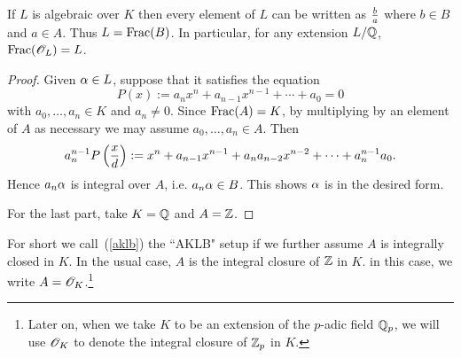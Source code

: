 \begin{pr}
If $L$ is algebraic over $K$ then every element of $L$ can be written as $\frac{b}{a}$ where $b\in B$ and $a\in A$. Thus  $L=\operatorname{Frac}(B)$.
In particular, for any extension $L/\mathbb{Q}$, $\operatorname{Frac}(\mathscr{O}_L)=L$.
\end{pr}
\begin{proof}
Given $\alpha\in L$, suppose that it satisfies the equation
\[
P(x):=a_nx^n+a_{n-1}x^{n-1}+\cdots +a_0=0
\]
with $a_0,\ldots, a_n\in K$ and $a_n\ne 0$. Since $\operatorname{Frac}(A)=K$, by multiplying by an element of $A$ as necessary we may assume $a_0,\ldots, a_n\in A$. Then
\[
a_n^{n-1}P\left( {\frac{x}{d}} \right):=x^n+a_{n-1}x^{n-1}+a_na_{n-2}x^{n-2}+\cdots +a_n^{n-1}a_0.
\]
Hence $a_n\alpha$ is integral over $A$, i.e. $a_n\alpha \in B$. This shows $\alpha$ is in the desired form.

For the last part, take $K=\mathbb{Q}$ and $A=\mathbb{Z}$.
\end{proof}
For short we call~(\ref{aklb}) the ``AKLB" setup if we further assume $A$ is integrally closed in $K$. In the usual case, $A$ is the integral closure of $\mathbb{Z}$ in $K$. in this case, we write $A=\mathscr{O}_K$.\footnote{Later on, when we take $K$ to be an extension of the $p$-adic field $\mathbb{Q}_p$, we will use $\mathscr{O}_K$ to denote the integral closure of $\mathbb{Z}_p$ in $K$.}

